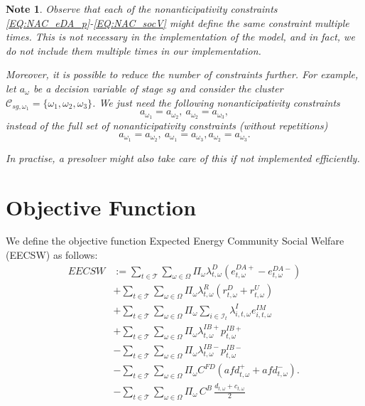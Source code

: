\documentclass{article}
\newtheorem{note}{Note}[section]
\begin{document}
\begin{note}
Observe that each of the nonanticipativity constraints \eqref{EQ:NAC_eDA_p}-\eqref{EQ:NAC_socV} might define the same constraint multiple times. This is not necessary in the implementation of the model, and in fact, we do not include them multiple times in our implementation.
	
Moreover, it is possible to reduce the number of constraints further. For example, let $a_{\omega}$ be a decision variable of stage $sg$ and consider the cluster $\mathcal{C}_{sg, \omega_1} = \{ \omega_1, \omega_2, \omega_3 \}$. We just need the following nonanticipativity constraints 
$$
a_{\omega_1} = a_{\omega_2}, \ a_{\omega_2} = a_{\omega_3},
$$
instead of the full set of nonanticipativity constraints (without repetitions)
$$
a_{\omega_1} = a_{\omega_2}, \ a_{\omega_1} = a_{\omega_3}, a_{\omega_2} = a_{\omega_3}.
$$

In practise, a presolver might also take care of this if not implemented efficiently.	
\end{note}


\section{Objective Function}
\label{SEC:ObjectiveFunction}

We define the objective function Expected Energy Community Social Welfare (EECSW) as follows:
\begin{subequations}
	\begin{align}
		EECSW & := \sum_{t \in \mathcal{T}} \sum_{\omega \in \Omega} \Pi_{\omega} \lambda^D_{t, \omega} (e^{DA+}_{t, \omega} - e^{DA-}_{t, \omega}) \label{EQ:DAincome} \\
		& + \sum_{t \in \mathcal{T}} \sum_{\omega \in \Omega} \Pi_{\omega} \lambda^R_{t, \omega} (r^D_{t, \omega} + r^U_{t, \omega}) \label{EQ:RESincome} \\
		& + \sum_{t \in \mathcal{T}} \sum_{\omega \in \Omega} \Pi_{\omega} \sum_{i \in \mathcal{I}_t} \lambda^{I}_{i, t, \omega} e^{IM}_{i, t, \omega} \label{EQ:IMincome} \\
		& + \sum_{t \in \mathcal{T}} \sum_{\omega \in \Omega} \Pi_{\omega} \lambda^{IB+}_{t, \omega} p^{IB+}_{t, \omega} \label{EQ:PosIBcollectRights} \\
		& - \sum_{t \in \mathcal{T}} \sum_{\omega \in \Omega} \Pi_{\omega} \lambda^{IB-}_{t, \omega} p^{IB-}_{t, \omega} \label{EQ:NegIBPayObligations} \\
		& - \sum_{t \in \mathcal{T}} \sum_{\omega \in \Omega} \Pi_{\omega} C^{FD} (afd^+_{t, \omega} + afd^-_{t, \omega}). \label{EQ:DemFlexPenalty} \\
        & - \sum_{t \in \mathcal{T}} \sum_{\omega \in \Omega} \Pi_{\omega} \, C^{B} \, \frac{d_{t,\omega} + c_{t,\omega}}{2} \label{EQ:BESSDegCost}
	\end{align}
	\label{EQ:EECSW}
\end{subequations}
\end{document}
